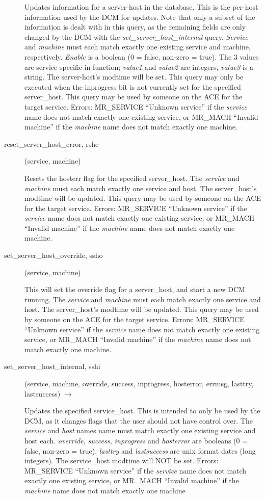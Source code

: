 \begin{description}
Updates information for a server-host in the database.  This is the
per-host information used by the DCM for updates.  Note that only a
subset of the information is dealt with in this query, as the
remaining fields are only changed by the DCM with the
{\em set\_server\_host\_internal} query.  {\em Service} and {\em machine} must
each match exactly one existing service and machine, respectively.
{\em Enable} is a boolean (0 = false, non-zero = true).  The 3 values
are service specific in function; {\em value1} and {\em value2} are
integers, {\em value3} is a string.  The server-host's modtime will be
set.  This query may only be executed when the inprogress bit is not
currently set for the specified server\_host.  This query may be used
by someone on the ACE for the target service.  Errors: MR\_SERVICE
``Unknown service'' if the {\em service} name does not match exactly one
existing service, or MR\_MACH ``Invalid machine'' if the {\em machine}
name does not match exactly one machine.


\item[reset\_server\_host\_error, rshe](service, machine)

Resets the hosterr flag for the specified server\_host.  The
{\em service} and {\em machine} must each match exactly one service and
host.  The server\_host's modtime will be updated.  This query may be
used by someone on the ACE for the target service.  Errors:
MR\_SERVICE ``Unknown service'' if the {\em service} name does not match
exactly one existing service, or MR\_MACH ``Invalid machine'' if the
{\em machine} name does not match exactly one machine.

\item[set\_server\_host\_override, ssho](service, machine)

This will set the override flag for a server\_host, and start a new DCM
running.  The {\em service} and {\em machine} must each match exactly one
service and host.  The server\_host's modtime will be updated.  This
query may be used by someone on the ACE for the target service.
Errors: MR\_SERVICE ``Unknown service'' if the {\em service} name does not
match exactly one existing service, or MR\_MACH ``Invalid machine'' if
the {\em machine} name does not match exactly one machine.

\item[set\_server\_host\_internal, sshi](service, machine, override,
success, inprogress, hosterror, errmsg, lasttry, lastsuccess)
$\rightarrow$

Updates the specified service\_host.  This is intended to only be used
by the DCM, as it changes flags that the user should not have control
over.  The {\em service} and {\em host} names name must match exactly one
existing service and host each.  {\em override, success, inprogress} and
{\em hosterror} are booleans (0 = false, non-zero = true).  {\em lasttry}
and {\em lastsuccess} are unix format dates (long integers).  The
service\_host modtime will NOT be set.  Errors: MR\_SERVICE ``Unknown
service'' if the {\em service} name does not match exactly one existing
service, or MR\_MACH ``Invalid machine'' if the {\em machine} name does
not match exactly one machine


\end{description}
